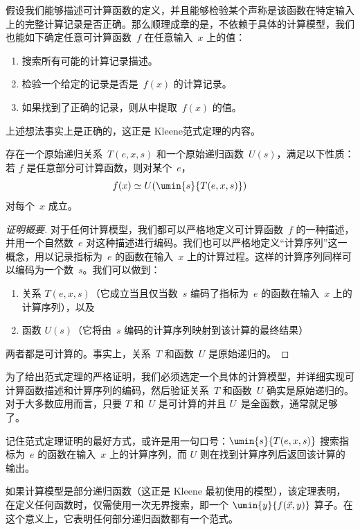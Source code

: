 \documentclass[../../../include/open-logic-section]{subfiles}
\begin{document}

假设我们能够描述可计算函数的定义，并且能够检验某个声称是该函数在特定输入上的完整计算记录是否正确。那么顺理成章的是，不依赖于具体的计算模型，我们也能如下确定任意可计算函数~$f$ 在任意输入~$x$ 上的值：
\begin{enumerate}
  \item 搜索所有可能的计算记录描述。
  \item 检验一个给定的记录是否是~$f(x)$ 的计算记录。
  \item 如果找到了正确的记录，则从中提取~$f(x)$ 的值。
\end{enumerate}

上述想法事实上是正确的，这正是 Kleene范式定理的内容。

\begin{thm}
存在一个原始递归关系~$T(e, x, s)$ 和一个原始递归函数~$U(s)$，满足以下性质：若 $f$ 是任意部分可计算函数，则对某个~$e$，
\[
f(x) \simeq U(\umin{s}{T(e, x, s)})
\]
对每个~$x$ 成立。
\end{thm}

\begin{proof}[证明概要]
对于任何计算模型，我们都可以严格地定义可计算函数~$f$ 的一种描述，并用一个自然数~$e$ 对这种描述进行编码。我们也可以严格地定义“计算序列”这一概念，用以记录指标为~$e$ 的函数在输入~$x$ 上的计算过程。这样的计算序列同样可以编码为一个数~$s$。我们可以做到：
\begin{enumerate}
  \item 关系 $T(e, x, s)$（它成立当且仅当数~$s$ 编码了指标为~$e$ 的函数在输入~$x$ 上的计算序列），以及
  \item 函数 $U(s)$（它将由~$s$ 编码的计算序列映射到该计算的最终结果）
\end{enumerate}
两者都是可计算的。事实上，关系~$T$ 和函数~$U$ 是原始递归的。
\end{proof}

\begin{explain}
为了给出范式定理的严格证明，我们必须选定一个具体的计算模型，并详细实现可计算函数描述和计算序列的编码，然后验证关系~$T$ 和函数~$U$ 确实是原始递归的。对于大多数应用而言，只要 $T$ 和~$U$ 是可计算的并且 $U$~是全函数，通常就足够了。

记住范式定理证明的最好方式，或许是用一句口号：$\umin{s}{T(e, x, s)}$ 搜索指标为~$e$ 的函数在输入~$x$ 上的计算序列，而 $U$ 则在找到计算序列后返回该计算的输出。
\end{explain}

如果计算模型是部分递归函数（这正是 Kleene 最初使用的模型），该定理表明，在定义任何函数时，仅需使用一次无界搜索，即一个 $\umin{y}{f(\vec x, y)}$ 算子。在这个意义上，它表明任何部分递归函数都有一个范式。
\end{document}
